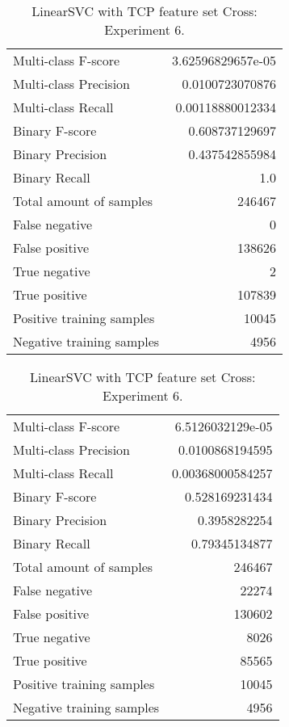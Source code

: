 \begin{table}[H]
\begin{minipage}{0.5\textwidth}
\caption{LinearSVC with TCP feature set Cross: Experiment 5.}
\centering
\begin{tabular}{l r}
\toprule
Multi-class F-score & 3.62596829657e-05 \\
Multi-class Precision & 0.0100723070876 \\
Multi-class Recall & 0.00118880012334 \\
\midrule
Binary F-score & 0.608737129697 \\
Binary Precision & 0.437542855984 \\
Binary Recall & 1.0 \\
\midrule
Total amount of samples & 246467 \\
False negative & 0 \\
False positive & 138626 \\
True negative & 2 \\
True positive & 107839 \\
\midrule
Positive training samples & 10045 \\
Negative training samples & 4956 \\
\bottomrule
\end{tabular}
\end{minipage}
\hfillx
\begin{minipage}{0.5\textwidth}
\caption{LinearSVC with TCP feature set Cross: Experiment 6.}
\centering
\begin{tabular}{l r}
\toprule
Multi-class F-score & 6.5126032129e-05 \\
Multi-class Precision & 0.0100868194595 \\
Multi-class Recall & 0.00368000584257 \\
\midrule
Binary F-score & 0.528169231434 \\
Binary Precision & 0.3958282254 \\
Binary Recall & 0.79345134877 \\
\midrule
Total amount of samples & 246467 \\
False negative & 22274 \\
False positive & 130602 \\
True negative & 8026 \\
True positive & 85565 \\
\midrule
Positive training samples & 10045 \\
Negative training samples & 4956 \\
\bottomrule
\end{tabular}
\end{minipage}
\end{table}
